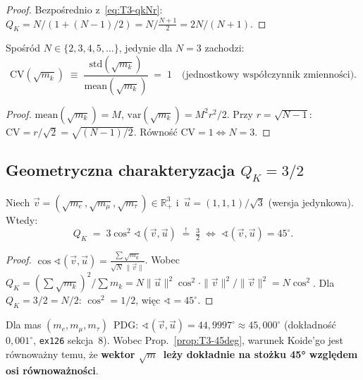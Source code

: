 \begin{proof}
Bezpo\'srednio z~\eqref{eq:T3-qkNr}: $Q_K = N/(1+(N-1)/2) = N/\frac{N+1}{2} = 2N/(N+1)$.
\end{proof}

\begin{corollary}[Wyj\k{a}tkowo\'s\'c $N=3$]\label{cor:T3-N3-special}
Spo\'sr\'od $N \in \{2, 3, 4, 5, \ldots\}$, jedynie dla $N = 3$ zachodzi:
\[
  \mathrm{CV}(\sqrt{m_k})
  \;\equiv\; \frac{\mathrm{std}(\sqrt{m_k})}{\mathrm{mean}(\sqrt{m_k})}
  \;=\; 1
  \quad\text{(jednostkowy wsp\'o\l{}czynnik zmienno\'sci)}.
\]
\end{corollary}

\begin{proof}
$\mathrm{mean}(\sqrt{m_k}) = M$,\; $\mathrm{var}(\sqrt{m_k}) = M^2 r^2/2$.
Przy $r = \sqrt{N-1}$: $\mathrm{CV} = r/\sqrt{2} = \sqrt{(N-1)/2}$.
R\'owno\'s\'c $\mathrm{CV} = 1 \Leftrightarrow N = 3$.
\end{proof}

\subsection{Geometryczna charakteryzacja $Q_K = 3/2$}
\label{app:T3-geom}

\begin{proposition}[K\k{a}t $45^\circ$]\label{prop:T3-45deg}
Niech $\vec{v} = (\sqrt{m_e}, \sqrt{m_\mu}, \sqrt{m_\tau}) \in \mathbb{R}^3_+$
i~$\vec{u} = (1, 1, 1)/\sqrt{3}$ (wersja jedynkowa).  Wtedy:
\begin{equation}\label{eq:T3-cos45}
  Q_K \;=\; 3\cos^2\sphericalangle(\vec{v}, \vec{u})
  \;\overset{!}{=}\; \tfrac{3}{2}
  \;\Longleftrightarrow\;
  \sphericalangle(\vec{v}, \vec{u}) = 45^\circ.
\end{equation}
\end{proposition}

\begin{proof}
$\cos\sphericalangle(\vec{v}, \vec{u}) = \frac{\sum\sqrt{m_k}}{\sqrt{N}\,\|\vec{v}\|}$.
Wobec $Q_K = (\sum\sqrt{m_k})^2/\sum m_k = N\|\vec{u}\|^2\cos^2 \cdot \|\vec{v}\|^2/\|\vec{v}\|^2 = N\cos^2$.
Dla $Q_K = 3/2 = N/2$: $\cos^2 = 1/2$, wi\k{e}c $\sphericalangle = 45^\circ$.
\end{proof}

\begin{remark}
Dla mas $(m_e, m_\mu, m_\tau)$~PDG:
$\sphericalangle(\vec{v}, \vec{u}) = 44{,}9997^\circ \approx 45{,}000^\circ$
(dok\l{}adno\'s\'c $0{,}001^\circ$, \texttt{ex126} sekcja~8).
Wobec Prop.~\ref{prop:T3-45deg}, warunek Koide'go jest r\'ownowa\.zny
temu, \.ze \textbf{wektor $\sqrt{m}$~le\.zy dok\l{}adnie na sto\.zku 45°
wzgl\k{e}dem osi r\'ownowa\.zno\'sci}.
\end{remark}

